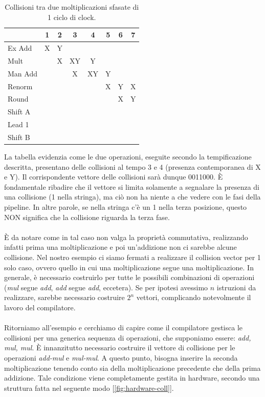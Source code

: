 \begin{table}[!h]
\centering
\begin{tabular}{|l|c|c|c|c|c|c|c|}
\hline
         & 1 & 2 & 3 & 4 & 5 & 6 & 7 \\
\hline
Ex Add   & X & Y &   &   &   &   &   \\
\hline
Mult     &   & X & XY & Y &   &   &   \\
\hline
Man Add  &   &   & X & XY & Y &   &   \\
\hline
Renorm   &   &   &   &   & X & Y & X \\
\hline
Round    &   &   &   &   &   & X & Y \\
\hline
Shift A  &   &   &   &   &   &   &   \\
\hline
Lead 1   &   &   &   &   &   &   &   \\
\hline
Shift B  &   &   &   &   &   &   &   \\
\hline
\end{tabular}
\caption{Collisioni tra due moltiplicazioni sfasate di 1 ciclo di clock.}
\label{tab:collision}
\end{table}
La tabella evidenzia come le due operazioni, eseguite secondo la tempificazione descritta, presentano delle collisioni al tempo 3 e 4 (presenza contemporanea di X e Y). Il corrispondente vettore delle collisioni sarà dunque 0011000. \MakeUppercase{è} fondamentale ribadire che il vettore si limita solamente a segnalare la presenza di una collisione (1 nella stringa), ma ciò non ha niente a che vedere con le fasi della pipeline. In altre parole, se nella stringa c'è un 1 nella terza posizione, questo NON significa che la collisione riguarda la terza fase.
\\
\\
\MakeUppercase{è} da notare come in tal caso non valga la proprietà commutativa, realizzando infatti prima una moltiplicazione e poi un'addizione non ci sarebbe alcune collisione. Nel nostro esempio ci siamo fermati a realizzare il collision vector per 1 solo caso, ovvero quello in cui una moltiplicazione segue una moltiplicazione. In generale, è necessario costruirlo per tutte le possibili combinazioni di operazioni (\textit{mul} segue \textit{add}, \textit{add} segue \textit{add}, eccetera). Se per ipotesi avessimo \(n\) istruzioni da realizzare, sarebbe necessario costruire \(2^n\) vettori, complicando notevolmente il lavoro del compilatore.
\\
\\
Ritorniamo all'esempio e cerchiamo di capire come il compilatore gestisca le collisioni per una generica sequenza di operazioni, che supponiamo essere: \textit{add, mul, mul}. \MakeUppercase{è} innanzitutto necessario costruire il vettore di collisione per le operazioni \textit{add-mul} e \textit{mul-mul}. A questo punto, bisogna inserire la seconda moltiplicazione tenendo conto sia della moltiplicazione precedente che della prima addizione. Tale condizione viene completamente gestita in hardware, secondo una struttura fatta nel seguente modo [\ref{fig:hardware-coll}].
